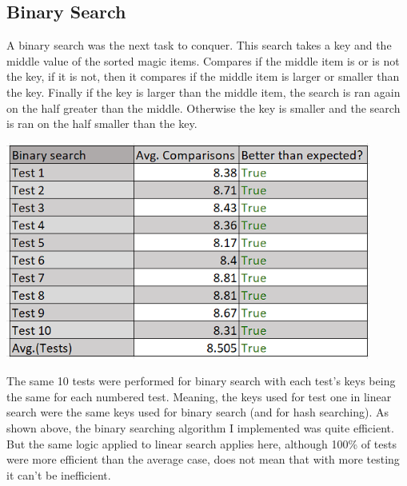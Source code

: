 \documentclass[12pt, letterpaper]{article}
\begin{document}
\subsection{Binary Search} \label{BinSch}
A binary search was the next task to conquer.
This search takes a key and the middle value of the sorted magic items.
Compares if the middle item is or is not the key, if it is not, then it compares if the middle item is larger or smaller than the key.
Finally if the key is larger than the middle item, the search is ran again on the half greater than the middle.
Otherwise the key is smaller and the search is ran on the half smaller than the key.
\begin{center}
   \includegraphics[width=120mm,scale=0.5]{BinSearch.png}
\end{center}
The same 10 tests were performed for binary search with each test's keys being the same for each numbered test.
Meaning, the keys used for test one in linear search were the same keys used for binary search (and for hash searching).
\newline
\indent As shown above, the binary searching algorithm I implemented was quite efficient.
But the same logic applied to linear search applies here, although 100\% of tests were more efficient than the average case, does not mean that with more testing it can't be inefficient.
\end{document}
